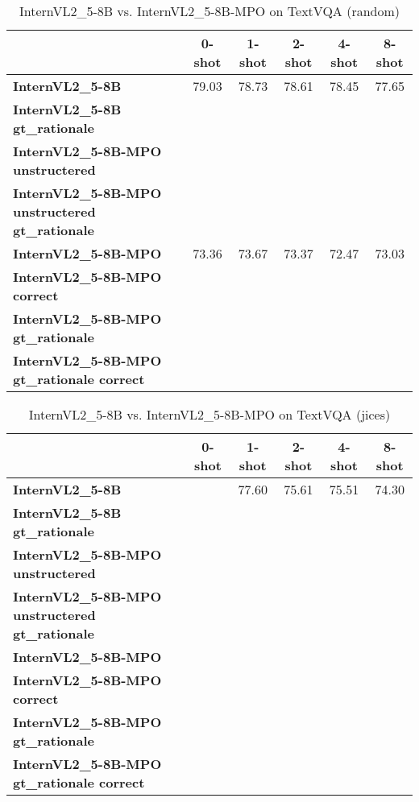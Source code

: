 \begin{table}
\caption{InternVL2\_5-8B vs. InternVL2\_5-8B-MPO on TextVQA (random)}
\label{tab:InternVL2_5-8B_TextVQA_TRAIN_random}
\begin{tabular}{lccccc}
\toprule
 & 0-shot & 1-shot & 2-shot & 4-shot & 8-shot \\
\midrule
\textbf{InternVL2\_5-8B} & 79.03 & 78.73 & 78.61 & 78.45 & 77.65 \\
\textbf{InternVL2\_5-8B gt\_rationale} &  &  &  &  &  \\
\textbf{InternVL2\_5-8B-MPO unstructered} &  &  &  &  &  \\
\textbf{InternVL2\_5-8B-MPO unstructered gt\_rationale} &  &  &  &  &  \\
\textbf{InternVL2\_5-8B-MPO} & 73.36 & 73.67 & 73.37 & 72.47 & 73.03 \\
\textbf{InternVL2\_5-8B-MPO correct} &  &  &  &  &  \\
\textbf{InternVL2\_5-8B-MPO gt\_rationale} &  &  &  &  &  \\
\textbf{InternVL2\_5-8B-MPO gt\_rationale correct} &  &  &  &  &  \\
\bottomrule
\end{tabular}
\end{table}


\begin{table}
\caption{InternVL2\_5-8B vs. InternVL2\_5-8B-MPO on TextVQA (jices)}
\label{tab:InternVL2_5-8B_TextVQA_TRAIN_jices}
\begin{tabular}{lccccc}
\toprule
 & 0-shot & 1-shot & 2-shot & 4-shot & 8-shot \\
\midrule
\textbf{InternVL2\_5-8B} &  & 77.60 & 75.61 & 75.51 & 74.30 \\
\textbf{InternVL2\_5-8B gt\_rationale} &  &  &  &  &  \\
\textbf{InternVL2\_5-8B-MPO unstructered} &  &  &  &  &  \\
\textbf{InternVL2\_5-8B-MPO unstructered gt\_rationale} &  &  &  &  &  \\
\textbf{InternVL2\_5-8B-MPO} &  &  &  &  &  \\
\textbf{InternVL2\_5-8B-MPO correct} &  &  &  &  &  \\
\textbf{InternVL2\_5-8B-MPO gt\_rationale} &  &  &  &  &  \\
\textbf{InternVL2\_5-8B-MPO gt\_rationale correct} &  &  &  &  &  \\
\bottomrule
\end{tabular}
\end{table}


